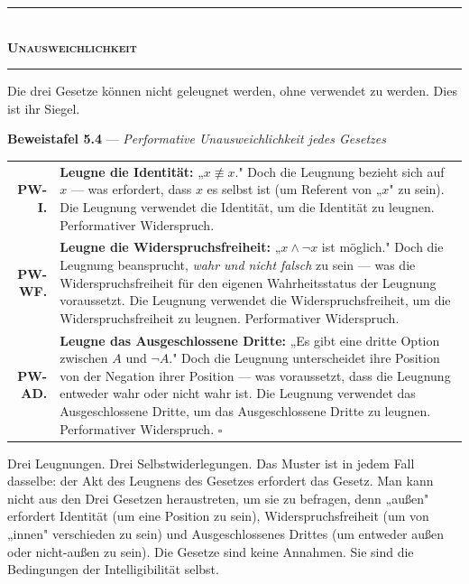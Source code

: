 \documentclass[10pt, openany, oneside]{book}
\renewcommand{\normalsize}{\fontsize{10}{13}\selectfont}
\renewcommand{\footnotesize}{\fontsize{8.5}{11}\selectfont}
\begin{document}
\begin{center}
    \rule{0.3\textwidth}{0.4pt}\\[0.5em]
    {\normalsize\bfseries\scshape Unausweichlichkeit}\\[0.3em]
    \rule{0.3\textwidth}{0.4pt}
\end{center}

\vspace{1em}

\noindent Die drei Gesetze können nicht geleugnet werden, ohne verwendet zu werden. Dies ist ihr Siegel.

\vspace{0.5em}

\textbf{Beweistafel 5.4} --- \textit{Performative Unausweichlichkeit jedes Gesetzes}

\vspace{0.5em}

{\footnotesize
\noindent\begin{tabular}{r p{}}
\textbf{PW-I.} & \textbf{Leugne die Identität:} „$x \not\equiv x$." Doch die Leugnung bezieht sich auf $x$ --- was erfordert, dass $x$ es selbst ist (um Referent von „$x$" zu sein). Die Leugnung verwendet die Identität, um die Identität zu leugnen. Performativer Widerspruch. \\[0.3em]
\textbf{PW-WF.} & \textbf{Leugne die Widerspruchsfreiheit:} „$x \wedge \neg x$ ist möglich." Doch die Leugnung beansprucht, \textit{wahr und nicht falsch} zu sein --- was die Widerspruchsfreiheit für den eigenen Wahrheitsstatus der Leugnung voraussetzt. Die Leugnung verwendet die Widerspruchsfreiheit, um die Widerspruchsfreiheit zu leugnen. Performativer Widerspruch. \\[0.3em]
\textbf{PW-AD.} & \textbf{Leugne das Ausgeschlossene Dritte:} „Es gibt eine dritte Option zwischen $A$ und $\neg A$." Doch die Leugnung unterscheidet ihre Position von der Negation ihrer Position --- was voraussetzt, dass die Leugnung entweder wahr oder nicht wahr ist. Die Leugnung verwendet das Ausgeschlossene Dritte, um das Ausgeschlossene Dritte zu leugnen. Performativer Widerspruch. $\square$ \\[0.3em]
\end{tabular}
}

\vspace{0.8em}

\noindent Drei Leugnungen. Drei Selbstwiderlegungen. Das Muster ist in jedem Fall dasselbe: der Akt des Leugnens des Gesetzes erfordert das Gesetz. Man kann nicht aus den Drei Gesetzen heraustreten, um sie zu befragen, denn „außen" erfordert Identität (um eine Position zu sein), Widerspruchsfreiheit (um von „innen" verschieden zu sein) und Ausgeschlossenes Drittes (um entweder außen oder nicht-außen zu sein). Die Gesetze sind keine Annahmen. Sie sind die Bedingungen der Intelligibilität selbst.
\end{document}

